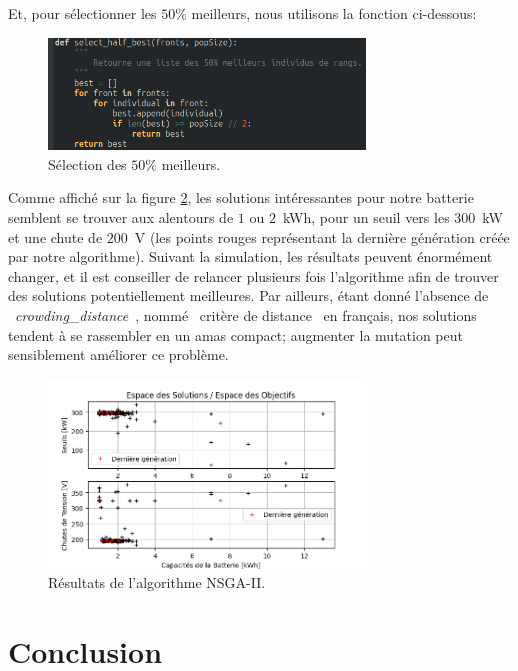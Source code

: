 \documentclass[11pt, a4paper, oneside, portrait]{report}
\begin{document}
        Et, pour sélectionner les $50\%{}$ meilleurs, nous utilisons la fonction ci-dessous:

        \begin{figure}[H]
            \centering
            \includegraphics[width=0.75\textwidth]{Figures/select_half_best.png}
            \caption{Sélection des $50\%{}$ meilleurs.}
            \label{fig:non_dominant_sort}
        \end{figure}

        Comme affiché sur la figure \ref{fig:NSGA2}, les solutions intéressantes pour notre batterie semblent se trouver aux alentours de $1$ ou $2$~kWh, pour un seuil vers les $300$~kW et une chute de $200$~V (les points rouges représentant la dernière génération créée par notre algorithme).
        Suivant la simulation, les résultats peuvent énormément changer, et il est conseiller de relancer plusieurs fois l'algorithme afin de trouver des solutions potentiellement meilleures.
        Par ailleurs, étant donné l'absence de \guillemotleft{}~\emph{crowding\_distance}~\guillemotright{}, nommé \guillemotleft{}~critère de distance~\guillemotright{} en français, nos solutions tendent à se rassembler en un amas compact; augmenter la mutation peut sensiblement améliorer ce problème.

        \begin{figure}[H]
            \centering
            \includegraphics[width=0.75\textwidth]{Figures/NSGA-II.png}
            \caption{Résultats de l'algorithme NSGA-II.}
            \label{fig:NSGA2}
        \end{figure}


    \section*{Conclusion}
\end{document}
